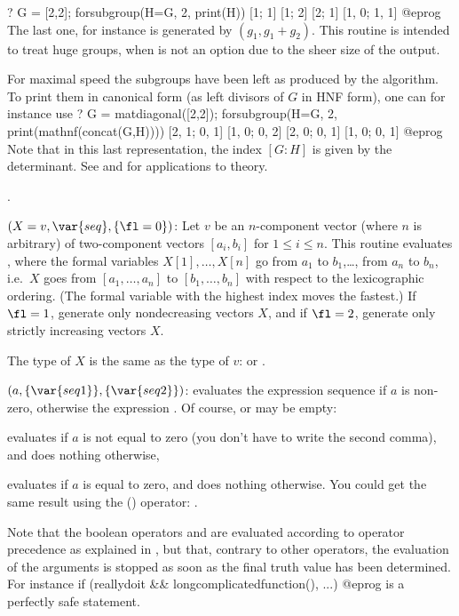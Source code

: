 \bprog
? G = [2,2]; forsubgroup(H=G, 2, print(H))
[1; 1]
[1; 2]
[2; 1]
[1, 0; 1, 1]
@eprog\noindent
The last one, for instance is generated by $(g_1, g_1 + g_2)$. This
routine is intended to treat huge groups, when  is not an
option due to the sheer size of the output.

For maximal speed the subgroups have been left as produced by the algorithm.
To print them in canonical form (as left divisors of $G$ in HNF form), one
can for instance use
\bprog
? G = matdiagonal([2,2]); forsubgroup(H=G, 2, print(mathnf(concat(G,H))))
[2, 1; 0, 1]
[1, 0; 0, 2]
[2, 0; 0, 1]
[1, 0; 0, 1]
@eprog\noindent
Note that in this last representation, the index $[G:H]$ is given by the
determinant. See  and  for
applications to  theory.

.

$(X=v,\var{seq},\{\fl=0\})$: \label{se:forvec}Let $v$ be an $n$-component
vector (where $n$ is arbitrary) of two-component vectors $[a_i,b_i]$
for $1\le i\le n$. This routine evaluates , where the formal
variables $X[1],\dots, X[n]$ go from $a_1$ to $b_1$,\dots, from $a_n$ to
$b_n$, i.e.~$X$ goes from $[a_1,\dots,a_n]$ to $[b_1,\dots,b_n]$ with respect
to the lexicographic ordering. (The formal variable with the highest index
moves the fastest.) If $\fl=1$, generate only nondecreasing vectors $X$, and
if $\fl=2$, generate only strictly increasing vectors $X$.

The type of $X$ is the same as the type of $v$:  or .

$(a,\{\var{seq1}\},\{\var{seq2}\})$: \label{se:if}evaluates the expression sequence  if $a$ is non-zero, otherwise
the expression . Of course,  or  may be empty:

 evaluates  if $a$ is not equal to zero
(you don't have to write the second comma), and does nothing otherwise,

 evaluates  if $a$ is equal to zero, and
does nothing otherwise. You could get the same result using the \kbd{!}
() operator: .

Note that the boolean operators \kbd{\&\&} and \kbd{||} are evaluated
according to operator precedence as explained in , but
that, contrary to other operators, the evaluation of the arguments is stopped
as soon as the final truth value has been determined. For instance
\bprog
if (reallydoit && longcomplicatedfunction(), ...)
@eprog
\noindent is a perfectly safe statement.

